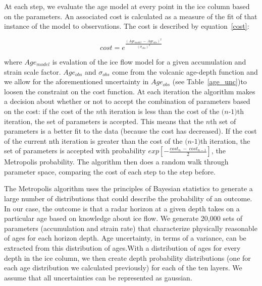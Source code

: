 \documentclass[draft,jgrga]{agutex}
\begin{document}
\begin{article}
At each step, we evaluate the age model at every point in the ice column based on the parameters.  An associated cost is calculated  as a measure of the fit of that instance of the model to observations. The cost is described by equation~\ref{cost}:

\begin{equation}\label{cost}
cost = e^\frac{(Age_{model}~ - ~Age_{obs})^2}{(\sigma_{obs})^2}
\end{equation}

where $Age_{model}$ is evalation of the \citet{morland2009} ice flow model for a given accumulation and strain scale factor. $Age_{obs}$ and $\sigma_{obs}$ come from the volcanic age-depth function and we allow for the aforementioned uncertainty in $Age_{obs}$ (see Table~\ref{age_unc})to loosen the constraint on the cost function. At each iteration the algorithm makes a decision about whether or not to accept the combination of parameters based on the cost: if the cost of the $\textit{n}$th iteration is less than the cost of the $\textit{(n-1)}$th iteration, the set of parameters is accepted. This means that the $\textit{n}$th set of parameters is a better fit to the data (because the cost has decreased). If the cost of the current nth iteration is greater than the cost of the $\textit{(n-1)}$th iteration, the set of parameters is accepted with probability $exp[-\frac{cost_n~-~cost_{n-1}}{2}]$, the Metropolis probability. The algorithm then does a random walk through parameter space, comparing the cost of each step to the step before.

The Metropolis algorithm uses the principles of Bayesian statistics to generate a large number of distributions that could describe the probability of an outcome. In our case, the outcome is that a radar horizon at a given depth takes on a particular age based on knowledge about ice flow. We generate 20,000 sets of parameters (accumulation and strain rate) that characterize  physically reasonable of ages for each horizon depth. Age uncertainty, in terms of a variance, can be extracted from this distribution of ages.With a distribution of ages for every depth in the ice column, we then create depth probability distributions (one for each age distribution we calculated previously) for each of the ten layers. We assume that all uncertainties can be represented as gaussian. 


\end{article}
\end{document}

